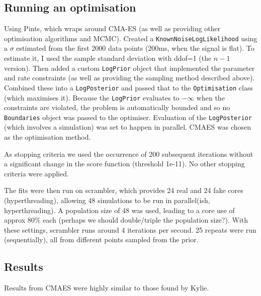 \documentclass[preprint,authoryear,10pt]{elsarticle}
\newcommand{\code}[1]{\texttt{#1}}
\begin{document}
\subsection{Running an optimisation}

Using Pints, which wraps around CMA-ES (as well as providing other
 optimisation algorithms and MCMC).
Created a \code{KnownNoiseLogLikelihood} using a $\sigma$ estimated from the
 first 2000 data points (200ms, when the signal is flat).
To estimate it, I used the sample standard deviation with ddof=1 (the $n - 1$
 version).
Then added a custom \code{LogPrior} object that implemented the parameter and
 rate constraints (as well as providing the sampling method described above).
Combined these into a \code{LogPosterior} and passed that to the
 \code{Optimisation} class (which maximises it).
Because the \code{LogPrior} evaluates to $-\infty$ when the constraints are
 violated, the problem is automatically bounded and so no \code{Boundaries}
 object was passed to the optimiser.
Evaluation of the \code{LogPosterior} (which involves a simulation) was set to
 happen in parallel.
CMAES was chosen as the optimisation method.

As stopping criteria we used the occurrence of 200 subsequent iterations
 without a significant change in the score function (threshold 1e-11).
No other stopping criteria were applied.

The fits were then run on scrambler, which provides 24 real and 24 fake cores
 (hyperthreading), allowing 48 simulations to be run in parallel(ish,
 hyperthreading).
A population size of 48 was used, leading to a core use of approx 80\% each
 (perhaps we should double/triple the population size?).
With these settings, scrambler runs around 4 iterations per second.
25 repeats were run (sequentially), all from different points sampled from the
 prior.

\subsection{Results}

Results from CMAES were highly similar to those found by Kylie.
\end{document}
